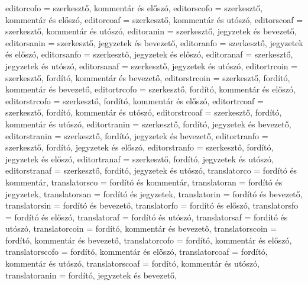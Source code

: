 {		editorcofo       = {szerkeszt\H{o}, komment\'ar \'es el\H{o}sz\'o},
		editorscofo      = {szerkeszt\H{o}, komment\'ar \'es el\H{o}sz\'o},
		editorcoaf       = {szerkeszt\H{o}, komment\'ar \'es ut\'osz\'o},
		editorscoaf      = {szerkeszt\H{o}, komment\'ar \'es ut\'osz\'o},
		editoranin       = {szerkeszt\H{o}, jegyzetek \'es bevezet\H{o}},
		editorsanin      = {szerkeszt\H{o}, jegyzetek \'es bevezet\H{o}},
		editoranfo       = {szerkeszt\H{o}, jegyzetek \'es el\H{o}sz\'o},
		editorsanfo      = {szerkeszt\H{o}, jegyzetek \'es el\H{o}sz\'o},
		editoranaf       = {szerkeszt\H{o}, jegyzetek \'es ut\'osz\'o},
		editorsanaf      = {szerkeszt\H{o}, jegyzetek \'es ut\'osz\'o},
		editortrcoin     = {szerkeszt\H{o}, ford\'it\'o, komment\'ar \'es bevezet\H{o}},
		editorstrcoin    = {szerkeszt\H{o}, ford\'it\'o, komment\'ar \'es bevezet\H{o}},
		editortrcofo     = {szerkeszt\H{o}, ford\'it\'o, komment\'ar \'es el\H{o}sz\'o},
		editorstrcofo    = {szerkeszt\H{o}, ford\'it\'o, komment\'ar \'es el\H{o}sz\'o},
		editortrcoaf     = {szerkeszt\H{o}, ford\'it\'o, komment\'ar \'es ut\'osz\'o},
		editorstrcoaf    = {szerkeszt\H{o}, ford\'it\'o, komment\'ar \'es ut\'osz\'o},
		editortranin     = {szerkeszt\H{o}, ford\'it\'o, jegyzetek \'es bevezet\H{o}},
		editorstranin    = {szerkeszt\H{o}, ford\'it\'o, jegyzetek \'es bevezet\H{o}},
		editortranfo     = {szerkeszt\H{o}, ford\'it\'o, jegyzetek \'es el\H{o}sz\'o},
		editorstranfo    = {szerkeszt\H{o}, ford\'it\'o, jegyzetek \'es el\H{o}sz\'o},
		editortranaf     = {szerkeszt\H{o}, ford\'it\'o, jegyzetek \'es ut\'osz\'o},
		editorstranaf    = {szerkeszt\H{o}, ford\'it\'o, jegyzetek \'es ut\'osz\'o},
		translatorco     = {ford\'it\'o \'es komment\'ar},
		translatorsco    = {ford\'it\'o \'es komment\'ar},
		translatoran     = {ford\'it\'o \'es jegyzetek},
		translatorsan    = {ford\'it\'o \'es jegyzetek},
		translatorin     = {ford\'it\'o \'es bevezet\H{o}},
		translatorsin    = {ford\'it\'o \'es bevezet\H{o}},
		translatorfo     = {ford\'it\'o \'es el\H{o}sz\'o},
		translatorsfo    = {ford\'it\'o \'es el\H{o}sz\'o},
		translatoraf     = {ford\'it\'o \'es ut\'osz\'o},
		translatorsaf    = {ford\'it\'o \'es ut\'osz\'o},
		translatorcoin   = {ford\'it\'o, komment\'ar \'es bevezet\H{o}},
		translatorscoin  = {ford\'it\'o, komment\'ar \'es bevezet\H{o}},
		translatorcofo   = {ford\'it\'o, komment\'ar \'es el\H{o}sz\'o},
		translatorscofo  = {ford\'it\'o, komment\'ar \'es el\H{o}sz\'o},
		translatorcoaf   = {ford\'it\'o, komment\'ar \'es ut\'osz\'o},
		translatorscoaf  = {ford\'it\'o, komment\'ar \'es ut\'osz\'o},
		translatoranin   = {ford\'it\'o, jegyzetek \'es bevezet\H{o}},
}
